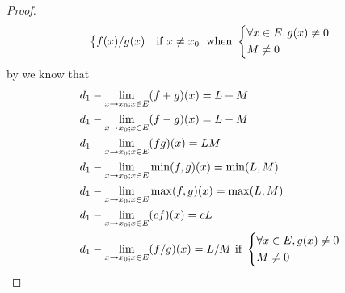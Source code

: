 \begin{proof}
\begin{align*}
\begin{dcases}
                                                         f(x) / g(x) & \text{if } x \neq x_0
                                                       \end{dcases} \text{ when } \begin{dcases}
                                                                                    \forall x \in E, g(x) \neq 0 \\
                                                                                    M \neq 0
                                                                                  \end{dcases}
  \end{align*}
  by  we know that
  \begin{align*}
     & d_1 - \lim_{x \to x_0 ; x \in E} (f + g)(x) = L + M                                          \\
     & d_1 - \lim_{x \to x_0 ; x \in E} (f - g)(x) = L - M                                          \\
     & d_1 - \lim_{x \to x_0 ; x \in E} (fg)(x) = LM                                                \\
     & d_1 - \lim_{x \to x_0 ; x \in E} \min(f, g)(x) = \min(L, M)                                  \\
     & d_1 - \lim_{x \to x_0 ; x \in E} \max(f, g)(x) = \max(L, M)                                  \\
     & d_1 - \lim_{x \to x_0 ; x \in E} (cf)(x) = cL                                                \\
     & d_1 - \lim_{x \to x_0 ; x \in E} (f / g)(x) = L / M \text{ if } \begin{dcases}
                                                                         \forall x \in E, g(x) \neq 0 \\
                                                                         M \neq 0
                                                                       \end{dcases}
  \end{align*}
\end{proof}
